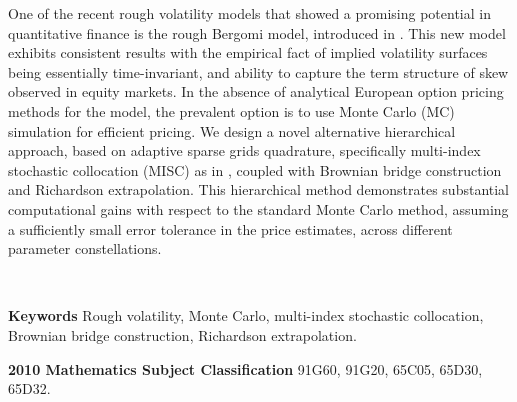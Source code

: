 One of the recent rough volatility models that showed a promising potential in quantitative finance   is the rough Bergomi model, introduced in \cite{bayer2016pricing}. This new model exhibits consistent results with the empirical fact of implied volatility surfaces being essentially time-invariant, and  ability to capture the term structure of skew observed in equity markets. In the absence of analytical European option pricing methods for the model,  the prevalent option is to use Monte Carlo (MC) simulation for efficient pricing. We design a novel alternative hierarchical approach, based on adaptive sparse grids quadrature, specifically  multi-index stochastic collocation (MISC) as in  \cite{haji2016multi}, coupled with Brownian bridge construction and Richardson extrapolation. This hierarchical method demonstrates substantial computational gains with respect to the standard Monte Carlo method, assuming a sufficiently small error tolerance in the price estimates, across different parameter constellations.

\

\textbf{Keywords} Rough volatility, Monte Carlo, multi-index stochastic collocation, Brownian bridge construction, Richardson extrapolation.

\textbf{2010 Mathematics Subject Classification} 	91G60, 	91G20, 65C05, 65D30, 65D32.